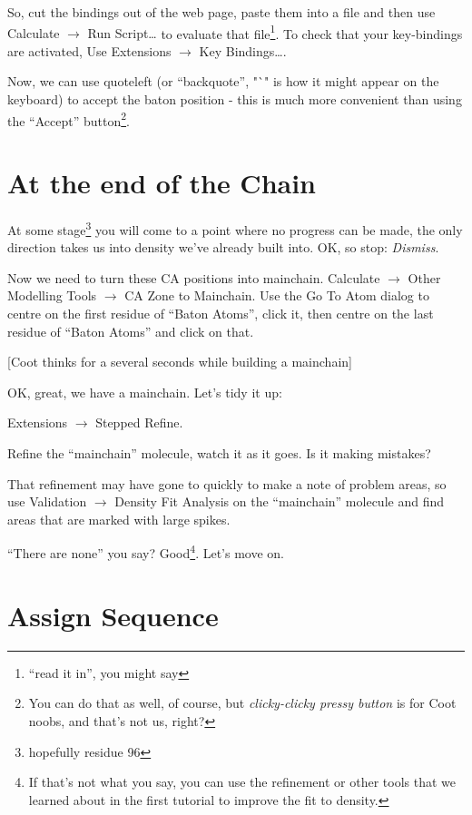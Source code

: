 \documentclass{article}
\begin{document}
So, cut the bindings out of the web page, paste them into a file and
then use \textsf{Calculate $\rightarrow$ Run Script\ldots} to evaluate
that file\footnote{``read it in'', you might say}.  To check that your
key-bindings are activated, Use \textsf{Extensions $\rightarrow$ Key
  Bindings\ldots}.

Now, we can use quoteleft (or ``backquote'', "`" is how it might
appear on the keyboard) to accept the baton position - this is much
more convenient than using the ``Accept'' button\footnote{You can do
  that as well, of course, but \emph{clicky-clicky pressy button} is for
Coot noobs, and that's not us, right?}.


\section{At the end of the Chain} 

At some stage\footnote{hopefully residue 96} you will come to a point
where no progress can be made, the only direction takes us into
density we've already built into.  OK, so stop: \textsl{Dismiss}.

Now we need to turn these CA positions into mainchain.
\textsf{Calculate $\rightarrow$ Other Modelling Tools $\rightarrow$ CA
  Zone to Mainchain}.  Use the \textsf{Go To Atom} dialog to centre on the
first residue of ``Baton Atoms'', click it, then centre on the last
residue of ``Baton Atoms'' and click on that.

\textsf{  [Coot thinks for a several seconds while building a mainchain]}

OK, great, we have a mainchain.  Let's tidy it up:

\textsf{Extensions $\rightarrow$ Stepped Refine}.  

Refine the ``mainchain'' molecule, watch it as it goes.  Is it making
mistakes?

That refinement may have gone to quickly to make a note of problem
areas, so use \textsf{Validation $\rightarrow$ Density Fit Analysis}
on the ``mainchain'' molecule and find areas that are marked with
large spikes.

``There are none'' you say?  Good\footnote{If that's not what you say,
  you can use the refinement or other tools that we learned about in
  the first tutorial to improve the fit to density.}. Let's move on.

\section{Assign Sequence}
\end{document}
